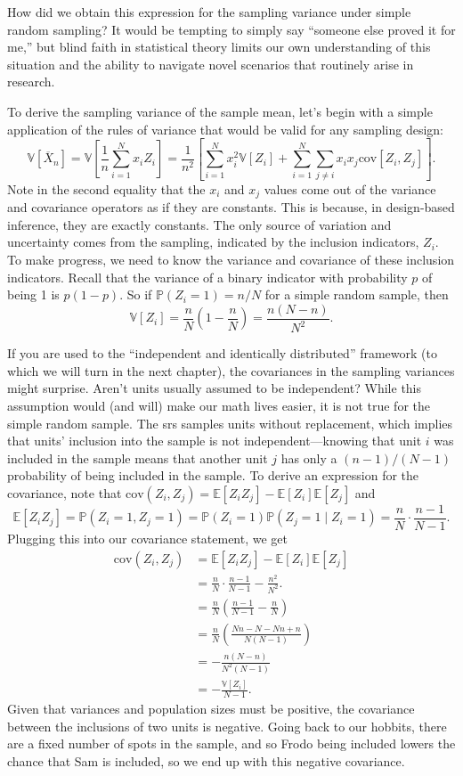 \documentclass[
  13pt,
  letterpaper,
  DIV=11,
  numbers=noendperiod]{scrreprt}
\newcommand{\E}{\mathbb{E}}
\newcommand{\V}{\mathbb{V}}
\newcommand{\cov}{\text{cov}}
\renewcommand{\P}{\mathbb{P}}
\newcommand{\Xbar}{\overline{X}}
\theoremstyle{plain}
\theoremstyle{plain}
\theoremstyle{definition}
\theoremstyle{definition}
\theoremstyle{remark}
\begin{document}
How did we obtain this expression for the sampling variance under simple
random sampling? It would be tempting to simply say ``someone else
proved it for me,'' but blind faith in statistical theory limits our own
understanding of this situation and the ability to navigate novel
scenarios that routinely arise in research.

To derive the sampling variance of the sample mean, let's begin with a
simple application of the rules of variance that would be valid for any
sampling design: \[
\V[\Xbar_{n}] = \V\left[\frac{1}{n} \sum_{i=1}^N x_iZ_i\right] = \frac{1}{n^2}\left[\sum_{i=1}^N x_i^2\V[Z_i] + \sum_{i=1}^N\sum_{j\neq i} x_ix_j\cov[Z_i,Z_j]\right].
\] Note in the second equality that the \(x_i\) and \(x_j\) values come
out of the variance and covariance operators as if they are constants.
This is because, in design-based inference, they are exactly constants.
The only source of variation and uncertainty comes from the sampling,
indicated by the inclusion indicators, \(Z_i\). To make progress, we
need to know the variance and covariance of these inclusion indicators.
Recall that the variance of a binary indicator with probability \(p\) of
being 1 is \(p(1 - p)\). So if \(\P(Z_i = 1) = n/N\) for a simple random
sample, then \[
\V[Z_i] = \frac{n}{N}\left(1 - \frac{n}{N}\right) = \frac{n(N - n)}{N^2}.
\]

If you are used to the ``independent and identically distributed''
framework (to which we will turn in the next chapter), the covariances
in the sampling variances might surprise. Aren't units usually assumed
to be independent? While this assumption would (and will) make our math
lives easier, it is not true for the simple random sample. The srs
samples units without replacement, which implies that units' inclusion
into the sample is not independent---knowing that unit \(i\) was
included in the sample means that another unit \(j\) has only a
\((n-1)/(N-1)\) probability of being included in the sample. To derive
an expression for the covariance, note that
\(\cov(Z_i, Z_j) = \E[Z_iZ_j] - \E[Z_i]\E[Z_j]\) and \[
\E[Z_iZ_j] = \P(Z_i = 1, Z_j = 1) = \P(Z_i = 1)\P(Z_j =1 \mid Z_i = 1) = \frac{n}{N}\cdot \frac{n-1}{N-1}.
\] Plugging this into our covariance statement, we get \[
\begin{aligned}
\cov(Z_i, Z_j) &= \E[Z_iZ_j] - \E[Z_i]\E[Z_j] \\ &= \frac{n}{N}\cdot \frac{n-1}{N-1} - \frac{n^2}{N^2}. \\
&=\frac{n}{N}\left(\frac{n-1}{N-1} - \frac{n}{N}\right) \\
&= \frac{n}{N}\left(\frac{Nn-N - Nn + n}{N(N-1)}\right) \\
&= -\frac{n(N- n)}{N^2(N-1)} \\
&= -\frac{\V[Z_i]}{N-1}.
\end{aligned}
\] Given that variances and population sizes must be positive, the
covariance between the inclusions of two units is negative. Going back
to our hobbits, there are a fixed number of spots in the sample, and so
Frodo being included lowers the chance that Sam is included, so we end
up with this negative covariance.
\end{document}
